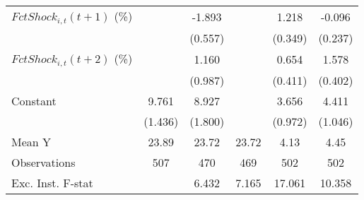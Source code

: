 {\begin{tabular}{l*{5}{c}}
\addlinespace
$ FctShock_{i,t}(t+1)$ (\%)&                     &      -1.893\sym{***}&                     &       1.218\sym{***}&      -0.096         \\
                    &                     &     (0.557)         &                     &     (0.349)         &     (0.237)         \\
\addlinespace
$ FctShock_{i,t}(t+2)$ (\%)&                     &       1.160         &                     &       0.654         &       1.578\sym{***}\\
                    &                     &     (0.987)         &                     &     (0.411)         &     (0.402)         \\
\addlinespace
Constant            &       9.761\sym{***}&       8.927\sym{***}&                     &       3.656\sym{***}&       4.411\sym{***}\\
                    &     (1.436)         &     (1.800)         &                     &     (0.972)         &     (1.046)         \\
\midrule
Mean Y              &       23.89         &       23.72         &       23.72         &        4.13         &        4.45         \\
Observations        &         507         &         470         &         469         &         502         &         502         \\
Exc. Inst. F-stat   &                     &       6.432         &       7.165         &      17.061         &      10.358         \\
\bottomrule
\end{tabular}
}

